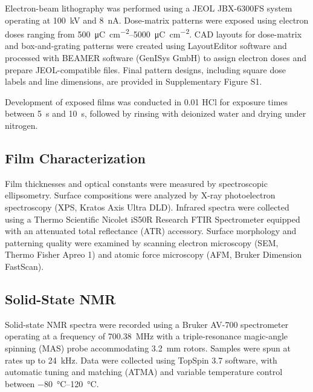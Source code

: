 Electron-beam lithography was performed using a JEOL JBX-6300FS system operating at \SI{100}{\kilo\volt} and \SI{8}{\nano\ampere}. Dose-matrix patterns were exposed using electron doses ranging from \SIrange{500}{5000}{\micro\coulomb\per\centi\meter\squared}. CAD layouts for dose-matrix and box-and-grating patterns were created using LayoutEditor software and processed with BEAMER software (GenISys GmbH) to assign electron doses and prepare JEOL-compatible files. Final pattern designs, including square dose labels and line dimensions, are provided in Supplementary Figure S1.

Development of exposed films was conducted in \SI{0.01}{\molar} HCl for exposure times between \SI{5}{\second} and \SI{10}{\second}, followed by rinsing with deionized water and drying under nitrogen.

\subsection{Film Characterization}

Film thicknesses and optical constants were measured by spectroscopic ellipsometry. Surface compositions were analyzed by X-ray photoelectron spectroscopy (XPS, Kratos Axis Ultra DLD). Infrared spectra were collected using a Thermo Scientific Nicolet iS50R Research FTIR Spectrometer equipped with an attenuated total reflectance (ATR) accessory. Surface morphology and patterning quality were examined by scanning electron microscopy (SEM, Thermo Fisher Apreo 1) and atomic force microscopy (AFM, Bruker Dimension FastScan).

\subsection{Solid-State NMR}

Solid-state  NMR spectra were recorded using a Bruker AV-700 spectrometer operating at a  frequency of \SI{700.38}{\mega\hertz} with a triple-resonance magic-angle spinning (MAS) probe accommodating \SI{3.2}{\milli\meter} rotors. Samples were spun at rates up to \SI{24}{\kilo\hertz}. Data were collected using TopSpin 3.7 software, with automatic tuning and matching (ATMA) and variable temperature control between \SIrange{-80}{120}{\celsius}.
